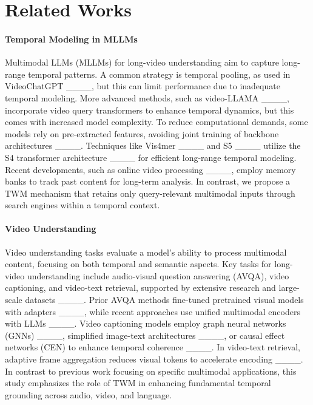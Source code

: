 \section{Related Works}
\label{related_works}
\paragraph{Temporal Modeling in MLLMs}
Multimodal LLMs (MLLMs) for long-video understanding aim to capture long-range temporal patterns. A common strategy is temporal pooling, as used in VideoChatGPT ____, but this can limit performance due to inadequate temporal modeling. More advanced methods, such as video-LLAMA ____, incorporate video query transformers to enhance temporal dynamics, but this comes with increased model complexity. To reduce computational demands, some models rely on pre-extracted features, avoiding joint training of backbone architectures ____. Techniques like Vis4mer ____ and S5 ____ utilize the S4 transformer architecture ____ for efficient long-range temporal modeling. Recent developments, such as online video processing ____, employ memory banks to track past content for long-term analysis. In contrast, we propose a TWM mechanism that retains only query-relevant multimodal inputs through search engines within a temporal context.

\paragraph{Video Understanding}
Video understanding tasks evaluate a model's ability to process multimodal content, focusing on both temporal and semantic aspects. Key tasks for long-video understanding include audio-visual question answering (AVQA), video captioning, and video-text retrieval, supported by extensive research and large-scale datasets ____. Prior AVQA methods fine-tuned pretrained visual models with adapters ____, while recent approaches use unified multimodal encoders with LLMs ____. Video captioning models employ graph neural networks (GNNs) ____, simplified image-text architectures ____, or causal effect networks (CEN) to enhance temporal coherence ____. In video-text retrieval, adaptive frame aggregation reduces visual tokens to accelerate encoding ____.
In contrast to previous work focusing on specific multimodal applications, this study emphasizes the role of TWM in enhancing fundamental temporal grounding across audio, video, and language.